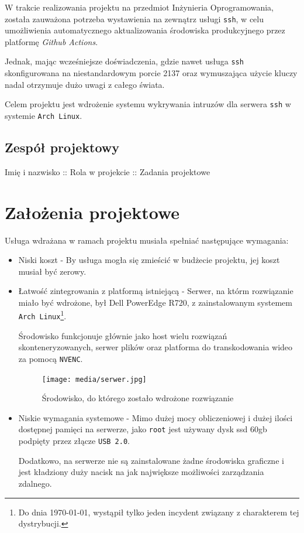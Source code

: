 \documentclass[12pt,a4paper]{article}
\begin{document}
W trakcie realizowania projektu na przedmiot Inżynieria Oprogramowania, została
zauważona potrzeba wystawienia na zewnątrz usługi \texttt{ssh}, w celu
umożliwienia automatycznego aktualizowania środowiska produkcyjnego przez
platformę \emph{Github Actions}.

Jednak, mając wcześniejsze doświadczenia, gdzie nawet usługa \texttt{ssh}
skonfigurowana na niestandardowym porcie 2137 oraz wymuszająca użycie kluczy
nadal otrzymuje dużo uwagi z całego świata.

Celem projektu jest wdrożenie systemu wykrywania intruzów dla serwera 
\texttt{ssh} w systemie \texttt{Arch Linux}.

\subsection{Zespół projektowy}
Imię i nazwisko :: Rola w projekcie :: Zadania projektowe

\newpage

\section{Założenia projektowe}

Usługa wdrażana w ramach projektu musiała spełniać następujące wymagania:

\begin{itemize}
  \item Niski koszt - By usługa mogła się zmieścić w budżecie projektu, jej
    koszt musiał być zerowy.
  \item Łatwość zintegrowania z platformą istniejącą - Serwer, na którm
    rozwiązanie miało być wdrożone, był Dell PowerEdge R720, z zainstalowanym
    systemem \texttt{Arch Linux}\footnote{Do dnia \today, wystąpił tylko jeden
    incydent związany z charakterem tej dystrybucji.}.

    Środowisko funkcjonuje głównie jako host wielu rozwiązań skonteneryzowanych, 
    serwer plików oraz platforma do transkodowania wideo za pomocą
    \texttt{NVENC}.

    \begin{figure}[h]
      \texttt{[image: media/serwer.jpg]}
      \centering
      \caption{Środowisko, do którego zostało wdrożone rozwiązanie}
    \end{figure}

  \item Niskie wymagania systemowe - Mimo dużej mocy obliczeniowej i dużej
    ilości dostępnej pamięci na serwerze, jako \texttt{root} jest używany dysk
    ssd 60gb podpięty przez złącze \texttt{USB 2.0}. 
    
    Dodatkowo, na serwerze nie są zainstalowane żadne środowiska graficzne i
    jest kładziony duży nacisk na jak największe możliwości zarządzania
    zdalnego.
\end{itemize}
\end{document}
